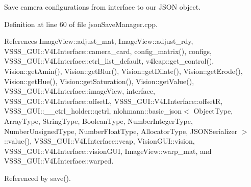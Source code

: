Save camera configurations from interface to our J\+S\+ON object. 



Definition at line 60 of file json\+Save\+Manager.\+cpp.



References Image\+View\+::adjust\+\_\+mat, Image\+View\+::adjust\+\_\+rdy, V\+S\+S\+S\+\_\+\+G\+U\+I\+::\+V4\+L\+Interface\+::camera\+\_\+card, config\+\_\+matrix(), configs, V\+S\+S\+S\+\_\+\+G\+U\+I\+::\+V4\+L\+Interface\+::ctrl\+\_\+list\+\_\+default, v4lcap\+::get\+\_\+control(), Vision\+::get\+Amin(), Vision\+::get\+Blur(), Vision\+::get\+Dilate(), Vision\+::get\+Erode(), Vision\+::get\+Hue(), Vision\+::get\+Saturation(), Vision\+::get\+Value(), V\+S\+S\+S\+\_\+\+G\+U\+I\+::\+V4\+L\+Interface\+::image\+View, interface, V\+S\+S\+S\+\_\+\+G\+U\+I\+::\+V4\+L\+Interface\+::offsetL, V\+S\+S\+S\+\_\+\+G\+U\+I\+::\+V4\+L\+Interface\+::offsetR, V\+S\+S\+S\+\_\+\+G\+U\+I\+::\+\_\+\+\_\+ctrl\+\_\+holder\+::qctrl, nlohmann\+::basic\+\_\+json$<$ Object\+Type, Array\+Type, String\+Type, Boolean\+Type, Number\+Integer\+Type, Number\+Unsigned\+Type, Number\+Float\+Type, Allocator\+Type, J\+S\+O\+N\+Serializer $>$\+::value(), V\+S\+S\+S\+\_\+\+G\+U\+I\+::\+V4\+L\+Interface\+::vcap, Vision\+G\+U\+I\+::vision, V\+S\+S\+S\+\_\+\+G\+U\+I\+::\+V4\+L\+Interface\+::vision\+G\+UI, Image\+View\+::warp\+\_\+mat, and V\+S\+S\+S\+\_\+\+G\+U\+I\+::\+V4\+L\+Interface\+::warped.



Referenced by save().


